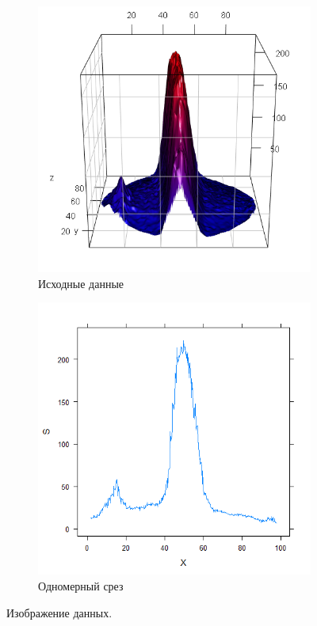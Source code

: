 \documentclass[specialist,
               substylefile = spbu.rtx,
               subf,href,colorlinks=true, 12pt]{disser}
\begin{document}
	\begin{figure}[h] 
    \centering
   \begin{subfigure}[b]{0.45\textwidth}
       \includegraphics[scale=0.4]{bk1_2d}
        \caption{Исходные данные}
    \end{subfigure}
    \begin{subfigure}[b]{0.45\textwidth}
        \includegraphics[scale=0.43]{bk1_1d}
        \caption{Одномерный срез}
    \end{subfigure}
    \caption{Изображение данных.}
    \label{fig:biodata}
\end{figure}  
\end{document}
